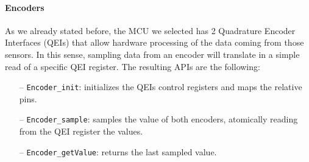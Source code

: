 \documentclass[10pt,a4paper, notitlepage]{report}
\begin{document}
\paragraph{Encoders} As we already stated before, the MCU we selected has 2 Quadrature Encoder Interfaces (QEIs) that allow hardware processing of the data coming from those sensors. In this sense, sampling data from an encoder will translate in a simple read of a specific QEI register. The resulting APIs are the following:
\begin{itemize}
  \item[--] \texttt{Encoder\_init}: initializes the QEIs control registers and maps the relative pins.
  \item[--] \texttt{Encoder\_sample}: samples the value of both encoders, atomically reading from the QEI register the values.
  \item[--] \texttt{Encoder\_getValue}: returns the last sampled value.
\end{itemize}
\end{document}
